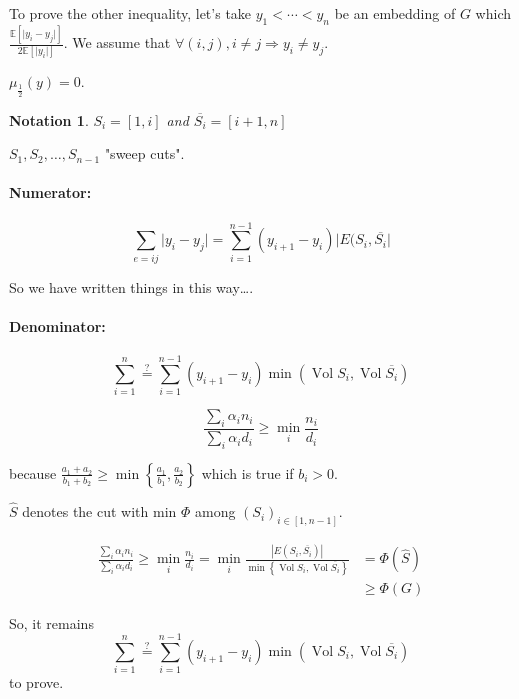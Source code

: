\documentclass[12pt]{article}
\newtheorem{notation}{Notation}
\newcommand{\EE}{\mathbb{E}}
\newcommand{\set}[1]{\left\{ #1 \right\}}
\newcommand{\brackets}[1]{\left[ #1 \right]}
\newcommand{\Ra}{\Rightarrow}
\newcommand{\card}[1]{\left\lvert#1\right\rvert}
\newcommand{\esp}[2][]{\underset{#1}{\EE}\left[ #2 \right]}
\DeclareMathOperator{\vol}{Vol}
\begin{document}
\bigskip

To prove the other inequality, let's take $y_1 < \cdots < y_n$ be an embedding of $G$ which $\frac{\esp{\lvert y_i-y_j\rvert}}{2\esp{\lvert y_i \rvert}}$. We assume that $\forall (i,j), i\neq j \Ra y_i \neq y_j$.

$\mu_{\frac{1}{2}}(y) = 0$.


\begin{notation}
    $S_i = \brackets{1,i}$ and $\overline{S_i} = \brackets{i+1,n}$
\end{notation}

$S_1, S_2,\ldots, S_{n-1}$ "sweep cuts".

\paragraph{Numerator:}

\[
    \sum\limits_{e=ij} \lvert y_i-y_j \rvert = \sum\limits_{i=1}^{n-1} (y_{i+1} - y_i) \lvert E(S_i, \overline{S_i} \rvert
\]

So we have written things in this way\dots.

\paragraph{Denominator:}


\[
    \sum\limits_{i=1}^n \overset{?}{=} \sum\limits_{i=1}^{n-1} (y_{i+1} - y_i) \min(\vol S_i, \vol \overline{S_i})
\]

\[
    \frac{\sum\limits_i \alpha_i n_i}{\sum\limits_i \alpha_i d_i} \geqslant \min\limits_i \frac{n_i}{d_i}
\]

because $\frac{a_1+a_2}{b_1+b_2} \geqslant \min\set{\frac{a_1}{b_1},\frac{a_2}{b_2}}$ which is true if $b_i > 0$.


$\hat{S}$ denotes the cut with min $\Phi$ among $(S_i)_{i\in\brackets{1,n-1}}$.


\[
    \begin{aligned}
        \frac{\sum\limits_i \alpha_i n_i}{\sum\limits_i \alpha_i d_i} \geqslant \min\limits_i \frac{n_i}{d_i} = \min_i \frac{\card{E(S_i,\overline{S_i})}}{\min\set{\vol S_i,\vol \overline{S_i}}} &= \Phi(\hat{S})\\
        &\geqslant \Phi(G)
    \end{aligned}
\]

So, it remains 
\[
    \sum\limits_{i=1}^n \overset{?}{=} \sum\limits_{i=1}^{n-1} (y_{i+1} - y_i) \min(\vol S_i, \vol \overline{S_i})
\]
to prove.
\end{document}
